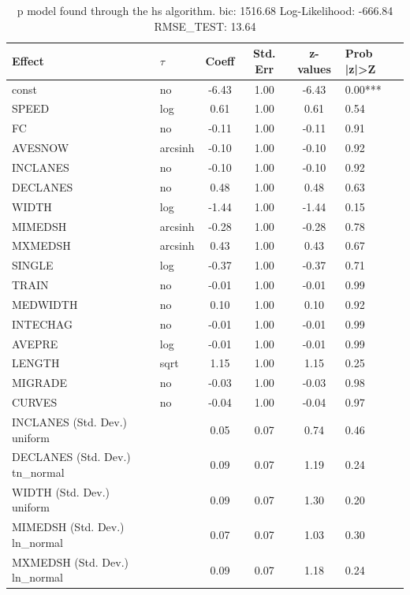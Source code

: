 \begin{table}
	\caption{p model found through the hs algorithm. bic: 1516.68 Log-Likelihood: -666.84 RMSE_TEST: 13.64}
	\begin{center}
		\begin{tabular}{|l|l|c|c|c|l|}
			\hline
			Effect & $\tau$ & Coeff & Std. Err & z-values & Prob |z|>Z \\
			\hline
			const & no & -6.43 & 1.00 & -6.43 & 0.00*** \\
			\hline
			SPEED & log & 0.61 & 1.00 & 0.61 & 0.54 \\
			\hline
			FC & no & -0.11 & 1.00 & -0.11 & 0.91 \\
			\hline
			AVESNOW & arcsinh & -0.10 & 1.00 & -0.10 & 0.92 \\
			\hline
			INCLANES & no & -0.10 & 1.00 & -0.10 & 0.92 \\
			\hline
			DECLANES & no & 0.48 & 1.00 & 0.48 & 0.63 \\
			\hline
			WIDTH & log & -1.44 & 1.00 & -1.44 & 0.15 \\
			\hline
			MIMEDSH & arcsinh & -0.28 & 1.00 & -0.28 & 0.78 \\
			\hline
			MXMEDSH & arcsinh & 0.43 & 1.00 & 0.43 & 0.67 \\
			\hline
			SINGLE & log & -0.37 & 1.00 & -0.37 & 0.71 \\
			\hline
			TRAIN & no & -0.01 & 1.00 & -0.01 & 0.99 \\
			\hline
			MEDWIDTH & no & 0.10 & 1.00 & 0.10 & 0.92 \\
			\hline
			INTECHAG & no & -0.01 & 1.00 & -0.01 & 0.99 \\
			\hline
			AVEPRE & log & -0.01 & 1.00 & -0.01 & 0.99 \\
			\hline
			LENGTH & sqrt & 1.15 & 1.00 & 1.15 & 0.25 \\
			\hline
			MIGRADE & no & -0.03 & 1.00 & -0.03 & 0.98 \\
			\hline
			CURVES & no & -0.04 & 1.00 & -0.04 & 0.97 \\
			\hline
			INCLANES (Std. Dev.) uniform &  & 0.05 & 0.07 & 0.74 & 0.46 \\
			\hline
			DECLANES (Std. Dev.) tn_normal &  & 0.09 & 0.07 & 1.19 & 0.24 \\
			\hline
			WIDTH (Std. Dev.) uniform &  & 0.09 & 0.07 & 1.30 & 0.20 \\
			\hline
			MIMEDSH (Std. Dev.) ln_normal &  & 0.07 & 0.07 & 1.03 & 0.30 \\
			\hline
			MXMEDSH (Std. Dev.) ln_normal &  & 0.09 & 0.07 & 1.18 & 0.24 \\

\end{tabular}
\end{center}
\end{table}
